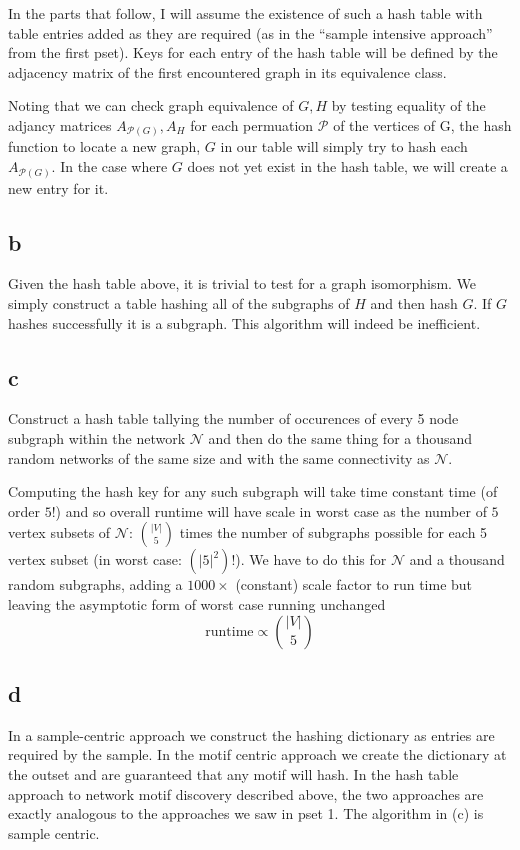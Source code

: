 \documentclass[12pt,draft,a4paper]{article}
\begin{document}
In the parts that follow, I will assume the existence of such a hash table with table entries added as they are required (as in the ``sample intensive approach'' from the first pset). Keys for each entry of the hash table will be defined by the adjacency matrix of the first encountered graph in its equivalence class. 

Noting that we can check graph equivalence of $G, H$ by testing equality of the adjancy matrices $A_{\mathcal{P}(G)}, A_H$ for each permuation $\mathcal{P}$ of the vertices of G, the hash function to locate a new graph, $G$ in our table will simply try to hash each $A_{\mathcal{P}(G)}$. In the case where $G$ does not yet exist in the hash table, we will create a new entry for it. 
\subsection*{b}
Given the hash table above, it is trivial to test for a graph isomorphism. We simply construct a table hashing all of the subgraphs of $H$ and then hash $G$. If $G$ hashes successfully it is a subgraph. This algorithm will indeed be inefficient.
\subsection*{c}
Construct a hash table tallying the number of occurences of every 5 node subgraph within the network $\mathcal{N}$ and then do the same thing for a thousand random networks of the same size and with the same connectivity as $\mathcal{N}$. 

Computing the hash key for any such subgraph will take time constant time (of order $5!$) and so overall runtime will have scale in worst case as the number of $5$ vertex subsets of $\mathcal{N}$: $|V| \choose 5$ times the number of subgraphs possible for each 5 vertex subset (in worst case: $\left( |5|^2 \right) !$). We have to do this for $\mathcal{N}$ and a thousand random subgraphs, adding a $1000\times$ (constant) scale factor to run time but leaving the asymptotic form of worst case running unchanged \begin{equation} \text{runtime} \propto \binom{|V|}{5}\end{equation}
\subsection*{d} 
In a sample-centric approach we construct the hashing dictionary as entries are required by the sample. In the motif centric approach we create the dictionary at the outset and are guaranteed that any motif will hash. In the hash table approach to network motif discovery described above, the two approaches are exactly analogous to the approaches we saw in pset 1. The algorithm in (c) is sample centric.
\end{document}

